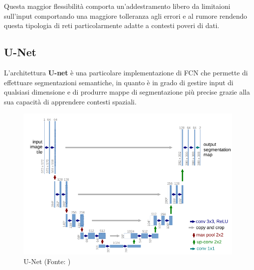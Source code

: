 Questa maggior flessibilità comporta un'addestramento libero da limitaioni sull'input comportando una maggiore tolleranza agli errori e al rumore rendendo questa tipologia di reti particolarmente adatte a contesti poveri di dati.


\subsection{U-Net}

L'architettura \textbf{U-net} \cite{ronneberger2015unet} è una particolare implementazione di FCN che permette di effettuare segmentazioni semantiche, in quanto è in grado di gestire input di qualsiasi dimensione e di produrre mappe di segmentazione pi\`u precise grazie alla sua capacit\`a di apprendere contesti spaziali.


\begin{figure}[!ht]
	\begin{adjustbox}{width=0.6\columnwidth, center}
		\includegraphics{./images/unet.png}
	\end{adjustbox}
	\caption{U-Net (Fonte: \cite{ronneberger2015unet})}
	\label{fig:unet}
\end{figure}




%
%
%
%
%
